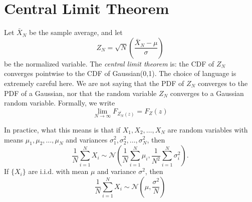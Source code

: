 \section{Central Limit Theorem}
Let $\bar{X}_N$ be the sample average,
and let
\begin{equation}
    Z_N = \sqrt{N} \left(\frac{\bar{X}_N-\mu}{\sigma}\right)
\end{equation}
be the normalized variable. The \emph{central limit theorem}
is: the CDF of $Z_N$ converges pointwise to the
CDF of Gaussian(0,1). The choice of language
is extremely careful here. We are not saying that the
PDF of $Z_N$ converges to the PDF of a Gaussian, nor that
the random variable $Z_N$ converges to a Gaussian random variable.
Formally, we write
\begin{equation}
    \lim_{N\rightarrow \infty} F_{\bar{Z_N}(z)} = F_Z(z)
\end{equation}

In practice, what this means is that if $X_1, X_2, \dots, X_N$
are random variables with means $\mu_1, \mu_2, \dots, \mu_N$ and
variances $\sigma_1^2, \sigma_2^2, \dots, \sigma_N^2$, then
\begin{equation}
    \frac{1}{N} \sum_{i=1}^{N} X_i \sim \mathcal{N}(\frac{1}{N} \sum_{i=1}^{N} \mu_i, \frac{1}{N^2} \sum_{i=1}^{N} \sigma_i^2).
\end{equation}
If $\{X_i\}$ are i.i.d. with mean $\mu$ and variance $\sigma^2$, then
\begin{equation}
    \frac{1}{N} \sum_{i=1}^{N} X_i \sim \mathcal{N}\left(\mu, \frac{\sigma^2}{N}\right)
\end{equation}